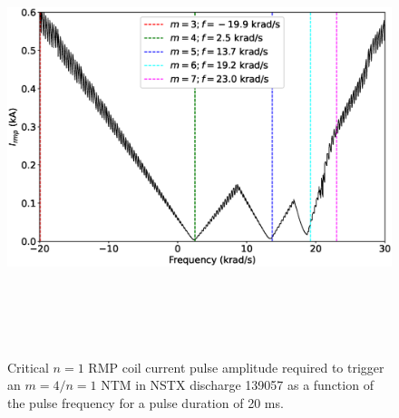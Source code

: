 \documentclass[12pt,prb,aps]{revtex4-1}
\begin{document}
\begin{figure}
\centerline{\includegraphics[height=5in]{Fig15.eps}}
\caption{Critical $n=1$ RMP coil current pulse amplitude required to trigger an $m=4/n=1$ NTM in NSTX discharge 139057 
as a function of the pulse frequency for a pulse duration of 20 ms.}\label{fig15}
\end{figure}
\end{document}

